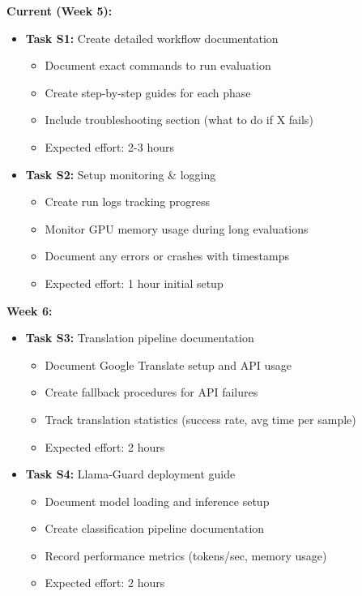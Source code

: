 \documentclass[11pt,a4paper]{article}
\begin{document}
\textbf{Current (Week 5):}
\begin{itemize}
    \item \textbf{Task S1:} Create detailed workflow documentation
    \begin{itemize}
        \item Document exact commands to run evaluation
        \item Create step-by-step guides for each phase
        \item Include troubleshooting section (what to do if X fails)
        \item Expected effort: 2-3 hours
    \end{itemize}

    \item \textbf{Task S2:} Setup monitoring \& logging
    \begin{itemize}
        \item Create run logs tracking progress
        \item Monitor GPU memory usage during long evaluations
        \item Document any errors or crashes with timestamps
        \item Expected effort: 1 hour initial setup
    \end{itemize}
\end{itemize}

\textbf{Week 6:}
\begin{itemize}
    \item \textbf{Task S3:} Translation pipeline documentation
    \begin{itemize}
        \item Document Google Translate setup and API usage
        \item Create fallback procedures for API failures
        \item Track translation statistics (success rate, avg time per sample)
        \item Expected effort: 2 hours
    \end{itemize}

    \item \textbf{Task S4:} Llama-Guard deployment guide
    \begin{itemize}
        \item Document model loading and inference setup
        \item Create classification pipeline documentation
        \item Record performance metrics (tokens/sec, memory usage)
        \item Expected effort: 2 hours
    \end{itemize}
\end{itemize}
\end{document}
